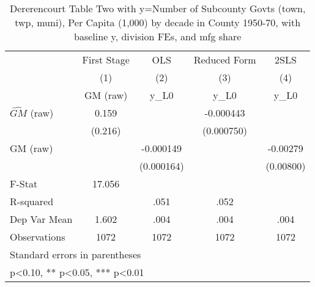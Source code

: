 \begin{table}[htbp]\centering
\def\sym#1{\ifmmode^{#1}\else\(^{#1}\)\fi}
\caption{Dererencourt Table Two with y=Number of Subcounty Govts (town, twp, muni), Per Capita (1,000) by decade in County 1950-70, with baseline y, division FEs, and mfg share}
\begin{tabular}{l*{4}{c}}
\toprule
                    & First Stage   &         OLS   &Reduced Form   &        2SLS   \\
                    &\multicolumn{1}{c}{(1)}&\multicolumn{1}{c}{(2)}&\multicolumn{1}{c}{(3)}&\multicolumn{1}{c}{(4)}\\
                    &\multicolumn{1}{c}{GM  (raw)}&\multicolumn{1}{c}{y\_L0}&\multicolumn{1}{c}{y\_L0}&\multicolumn{1}{c}{y\_L0}\\
\midrule
$\hat{GM}$ (raw)    &       0.159   &               &   -0.000443   &               \\
                    &     (0.216)   &               &  (0.000750)   &               \\
\addlinespace
GM  (raw)           &               &   -0.000149   &               &    -0.00279   \\
                    &               &  (0.000164)   &               &   (0.00800)   \\
\midrule
F-Stat              &      17.056   &               &               &               \\
R-squared           &               &        .051   &        .052   &               \\
Dep Var Mean        &       1.602   &        .004   &        .004   &        .004   \\
Observations        &        1072   &        1072   &        1072   &        1072   \\
\bottomrule
\multicolumn{5}{l}{\footnotesize Standard errors in parentheses}\\
\multicolumn{5}{l}{\footnotesize * p<0.10, ** p<0.05, *** p<0.01}\\
\end{tabular}
\end{table}
